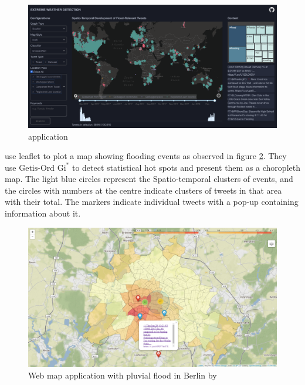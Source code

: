 \begin{figure}[H]
\begin{center}
  \includegraphics[width=\columnwidth]{./images/peter.png}
\end{center}
\caption{ application}
\label{fig:peter}
\end{figure}

 use leaflet to plot a map showing flooding events as
observed in figure \ref{fig:feng}. They use $\text{Getis-Ord Gi}^{\ast}$ \cite{ordLocalSpatialAutocorrelation2010}
to detect statistical hot spots and present them as a choropleth map. The light blue circles
represent the Spatio-temporal clusters of events, and the circles with numbers at the centre
indicate clusters of tweets in that area with their total. The markers indicate individual tweets
with a pop-up containing information about it.

\begin{figure}[H]
\begin{center}
  \includegraphics[width=\columnwidth]{./images/feng.png}
\end{center}
\caption{Web map application with pluvial flood in Berlin by }
\label{fig:feng}
\end{figure}

